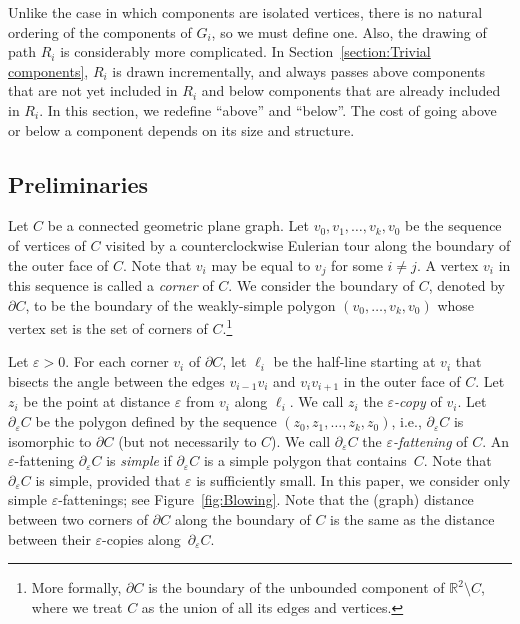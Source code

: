 \documentclass{patmorin}
\begin{document}
Unlike the case in which
components are isolated vertices, there is no natural ordering of the
components of $G_i$, so we must define one. Also, the drawing
of path $R_i$ is considerably more complicated.  In Section~\ref{section:Trivial components}, $R_i$ is drawn incrementally, and always passes above components that are not yet included in $R_i$ and below components that are already included in $R_i$.  In this section, we redefine ``above'' and ``below''. The cost of going above or below a component depends on its size and structure.


\subsection{Preliminaries}\label{section:Preliminaries}
Let $C$ be a connected geometric plane graph. Let $v_0, v_1, \ldots, v_k, v_0$ be the sequence of vertices of $C$ visited by a counterclockwise
Eulerian tour along the boundary of the outer face of $C$. Note that
$v_i$ may be equal to $v_j$ for some $i\neq j$.  A vertex $v_i$
in this sequence is called a \emph{corner} of $C$.  We consider the boundary of $C$, denoted by $\partial C$, to be the
boundary of the weakly-simple polygon $(v_0, \ldots, v_k, v_0)$ whose
vertex set is the set of corners of $C$.\footnote{More formally, $\partial C$ is the boundary of the unbounded component of $\mathbb{R}^2\setminus C$, where we treat $C$ as the union of all its edges and vertices.}

Let $\varepsilon >0$. For each corner $v_i$ of $\partial C$, let $\ell_i$ be the half-line starting at $v_i$ that bisects the angle between the edges $v_{i-1}v_i$ and $v_i v_{i+1}$ in the outer face of $C$. Let $z_i$ be the point at distance $\varepsilon$ from $v_i$ along $\ell_i$. We call $z_i$ the \emph{$\varepsilon$-copy} of $v_i$. Let $\partial_\varepsilon C$ be the polygon defined by the sequence $(z_0, z_1, \ldots, z_k, z_0)$, i.e., $\partial_\varepsilon C$ is isomorphic to $\partial C$ (but not necessarily to $C$). We call $\partial_\varepsilon C$ the \emph{$\varepsilon$-fattening} of $C$.
An $\varepsilon$-fattening $\partial_\varepsilon C$ is \emph{simple} if $\partial_\varepsilon C$  is a simple polygon that contains~$C$.
Note that $\partial_\varepsilon C$ is simple, provided that $\varepsilon$ is sufficiently small. In this paper, we consider only simple $\varepsilon$-fattenings; see Figure~\ref{fig:Blowing}. Note that the (graph) distance between two corners of $\partial C$ along the boundary of $C$ is the same as the distance between their $\varepsilon$-copies along~$\partial_\varepsilon C$.
\end{document}
